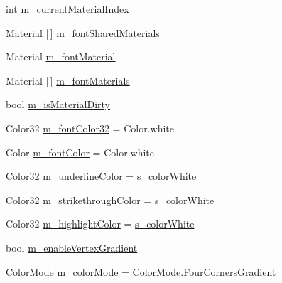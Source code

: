 \begin{DoxyCompactItemize}
\item 
int \mbox{\hyperlink{class_t_m_pro_1_1_t_m_p___text_ad2e5e38015cffa10cfcfb5c41a3200d7}{m\+\_\+current\+Material\+Index}}
\item 
Material \mbox{[}$\,$\mbox{]} \mbox{\hyperlink{class_t_m_pro_1_1_t_m_p___text_a3b2d8e88ab361ed95fb7530ba6221cf4}{m\+\_\+font\+Shared\+Materials}}
\item 
Material \mbox{\hyperlink{class_t_m_pro_1_1_t_m_p___text_afbb084460e2b6a1afa1ae8b239c18392}{m\+\_\+font\+Material}}
\item 
Material \mbox{[}$\,$\mbox{]} \mbox{\hyperlink{class_t_m_pro_1_1_t_m_p___text_af07ea707eae7c3967c7d57cf94569752}{m\+\_\+font\+Materials}}
\item 
bool \mbox{\hyperlink{class_t_m_pro_1_1_t_m_p___text_abfd2cb0eb73a715d6eb133ee0a50df15}{m\+\_\+is\+Material\+Dirty}}
\item 
Color32 \mbox{\hyperlink{class_t_m_pro_1_1_t_m_p___text_a3238cfe7336e60137a33ed8a92195d5c}{m\+\_\+font\+Color32}} = Color.\+white
\item 
Color \mbox{\hyperlink{class_t_m_pro_1_1_t_m_p___text_aa2cc30f4c4028451ff7d7f58462b7375}{m\+\_\+font\+Color}} = Color.\+white
\item 
Color32 \mbox{\hyperlink{class_t_m_pro_1_1_t_m_p___text_acf16e7fcbed763687eeccd6f6ebce5f5}{m\+\_\+underline\+Color}} = \mbox{\hyperlink{class_t_m_pro_1_1_t_m_p___text_acb51fd11a369b5109c803b6c57b284d1}{s\+\_\+color\+White}}
\item 
Color32 \mbox{\hyperlink{class_t_m_pro_1_1_t_m_p___text_afcf9dd30906172c14172e3e5b8f74027}{m\+\_\+strikethrough\+Color}} = \mbox{\hyperlink{class_t_m_pro_1_1_t_m_p___text_acb51fd11a369b5109c803b6c57b284d1}{s\+\_\+color\+White}}
\item 
Color32 \mbox{\hyperlink{class_t_m_pro_1_1_t_m_p___text_a260b12c93ccb9cb2afc1d643dcd82c95}{m\+\_\+highlight\+Color}} = \mbox{\hyperlink{class_t_m_pro_1_1_t_m_p___text_acb51fd11a369b5109c803b6c57b284d1}{s\+\_\+color\+White}}
\item 
bool \mbox{\hyperlink{class_t_m_pro_1_1_t_m_p___text_a00efc9a6683c21b0e66797dbfd8fa6a5}{m\+\_\+enable\+Vertex\+Gradient}}
\item 
\mbox{\hyperlink{namespace_t_m_pro_ad6c4f3ea250d747999f28f1f7678c4b3}{Color\+Mode}} \mbox{\hyperlink{class_t_m_pro_1_1_t_m_p___text_af1d4cf0db47d8a8db522e165216c6ab7}{m\+\_\+color\+Mode}} = \mbox{\hyperlink{namespace_t_m_pro_ad6c4f3ea250d747999f28f1f7678c4b3a67770dd4dc1eec40719e9e72336f234a}{Color\+Mode.\+Four\+Corners\+Gradient}}
\item 

\end{DoxyCompactItemize}
